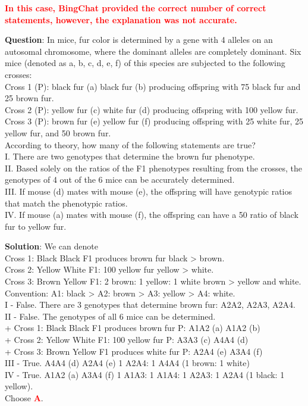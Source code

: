 \documentclass{article}
\begin{document}
{	\textcolor{red}{\textbf{In this case, BingChat provided the correct number of correct statements, however, the explanation was not accurate.}}
	\begin{mdframed}[linewidth=1pt,linecolor=red] \textbf{Question}: In mice, fur color is determined by a gene with 4 alleles on an autosomal chromosome, where the dominant alleles are completely dominant. Six mice (denoted as a, b, c, d, e, f) of this species are subjected to the following crosses: \\
		Cross 1 (P):  black fur (a)   black fur (b) producing  offspring with 75 black fur and 25 brown fur. \\
		Cross 2 (P):  yellow fur (c)   white fur (d) producing  offspring with 100 yellow fur. \\
		Cross 3 (P):  brown fur (e)   yellow fur (f) producing  offspring with 25 white fur, 25 yellow fur, and 50 brown fur.\\
		According to theory, how many of the following statements are true? \\
		I. There are two genotypes that determine the brown fur phenotype. \\
		II. Based solely on the ratios of the F1 phenotypes resulting from the crosses, the genotypes of 4 out of the 6 mice can be accurately determined. \\
		III. If mouse (d) mates with mouse (e), the offspring will have genotypic ratios that match the phenotypic ratios.\\ 
		IV. If mouse (a) mates with mouse (f), the offspring can have a 50 ratio of black fur to yellow fur.\\
		\begin{oneparchoices}
		\end{oneparchoices}
		
		\textbf{Solution}: We can denote \\
		Cross 1: Black  Black  F1 produces brown fur  black > brown. \\
		Cross 2: Yellow  White  F1: 100 yellow fur  yellow > white.\\
		Cross 3: Brown  Yellow  F1: 2 brown: 1 yellow: 1 white  brown > yellow and white. \\
		Convention: A1: black > A2: brown > A3: yellow > A4: white. \\
		I - False. There are 3 genotypes that determine brown fur: A2A2, A2A3, A2A4.\\
		II - False. The genotypes of all 6 mice can be determined.\\
		+ Cross 1: Black  Black  F1 produces brown fur  P: A1A2 (a)  A1A2 (b) \\
		+ Cross 2: Yellow  White  F1: 100 yellow fur  P: A3A3 (c)  A4A4 (d) \\
		+ Cross 3: Brown  Yellow  F1 produces white fur  P: A2A4 (e)  A3A4 (f) \\
		III - True. A4A4 (d)  A2A4 (e)  1 A2A4: 1 A4A4 (1 brown: 1 white) \\
		IV - True. A1A2 (a)  A3A4 (f)  1 A1A3: 1 A1A4: 1 A2A3: 1 A2A4 (1 black: 1 yellow). \\
		Choose \textcolor{red}{\textbf{A}}.
		

\end{mdframed}}
\end{document}
